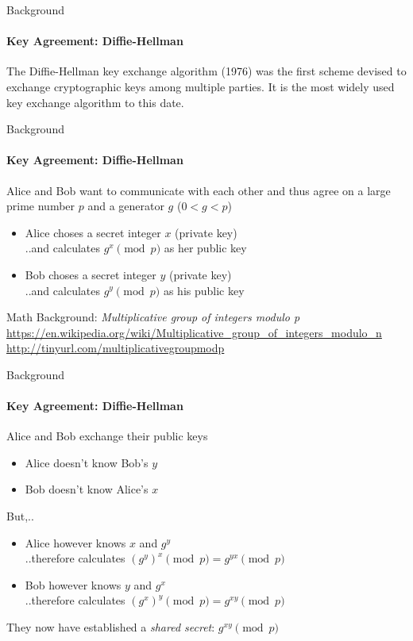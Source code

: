 \documentclass[hyperref={draft}]{beamer}
\begin{document}
\begin{frame}{Background}
  \framesubtitle{Key Agreement: Diffie-Hellman}
  The Diffie-Hellman key exchange algorithm (1976) was the first scheme devised to exchange cryptographic keys among multiple parties. It is the most widely used key exchange algorithm to this date.
\end{frame}

\begin{frame}{Background}
  \framesubtitle{Key Agreement: Diffie-Hellman}
  Alice and Bob want to communicate with each other and thus agree on a large prime 
  number $p$ and a generator $g$ ($0 < g < p$)
  \vspace{10px}
  \begin{itemize}
    \item Alice choses a secret integer $x$ (private key)\\
    ..and calculates $g^x \pmod p$ as her public key
    \item Bob choses a secret integer $y$ (private key)\\
    ..and calculates $g^y \pmod p$ as his public key
  \end{itemize}

  \vspace{55px}
  \tiny
  Math Background: \emph{Multiplicative group of integers modulo p}\\
  \url{https://en.wikipedia.org/wiki/Multiplicative_group_of_integers_modulo_n}\\
  \url{http://tinyurl.com/multiplicativegroupmodp}
\end{frame}

\begin{frame}{Background}
  \framesubtitle{Key Agreement: Diffie-Hellman}
  Alice and Bob exchange their public keys

  \begin{itemize}
    \item Alice doesn't know Bob's $y$
    \item Bob doesn't know Alice's $x$
  \end{itemize}
  But,..
  \begin{itemize}
    \item Alice however knows $x$ and $g^y$\\
    ..therefore calculates $(g^y)^x \pmod p = g^{yx} \pmod p$
    \item Bob however knows $y$ and $g^x$\\
    ..therefore calculates $(g^x)^y \pmod p = g^{xy} \pmod p$
  \end{itemize}

  \vspace{15px}

  They now have established a \emph{shared secret}: $g^{xy} \pmod p$
\end{frame}
\end{document}
